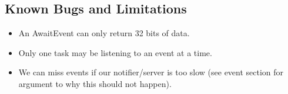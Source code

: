 \documentclass{article}
\begin{document}
\subsection{Known Bugs and Limitations}
\begin{itemize}
    \item An AwaitEvent can only return 32 bits of data.
    \item Only one task may be listening to an event at a time.
    \item We can miss events if our notifier/server is too slow (see event section for argument to why this should not happen).
\end{itemize}
\end{document}
